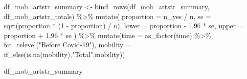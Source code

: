 \documentclass[
  letterpaper,
  DIV=11,
  numbers=noendperiod]{scrartcl}
\newenvironment{Shaded}{\begin{snugshade}}{\end{snugshade}}
\newcommand{\AttributeTok}[1]{\textcolor[rgb]{0.40,0.45,0.13}{#1}}
\newcommand{\DecValTok}[1]{\textcolor[rgb]{0.68,0.00,0.00}{#1}}
\newcommand{\FloatTok}[1]{\textcolor[rgb]{0.68,0.00,0.00}{#1}}
\newcommand{\FunctionTok}[1]{\textcolor[rgb]{0.28,0.35,0.67}{#1}}
\newcommand{\NormalTok}[1]{\textcolor[rgb]{0.00,0.23,0.31}{#1}}
\newcommand{\OtherTok}[1]{\textcolor[rgb]{0.00,0.23,0.31}{#1}}
\newcommand{\SpecialCharTok}[1]{\textcolor[rgb]{0.37,0.37,0.37}{#1}}
\newcommand{\StringTok}[1]{\textcolor[rgb]{0.13,0.47,0.30}{#1}}
\begin{document}
\begin{Shaded}
\begin{Highlighting}[]
\NormalTok{df\_mob\_artstr\_summary }\OtherTok{\textless{}{-}} \FunctionTok{bind\_rows}\NormalTok{(df\_mob\_artstr\_summary, df\_mob\_artstr\_totals) }\SpecialCharTok{\%\textgreater{}\%}
  \FunctionTok{mutate}\NormalTok{(}
    \AttributeTok{proportion =}\NormalTok{ n\_yes }\SpecialCharTok{/}\NormalTok{ n,}
    \AttributeTok{se =} \FunctionTok{sqrt}\NormalTok{(proportion }\SpecialCharTok{*}\NormalTok{ (}\DecValTok{1} \SpecialCharTok{{-}}\NormalTok{ proportion) }\SpecialCharTok{/}\NormalTok{ n),}
    \AttributeTok{lower =}\NormalTok{ proportion }\SpecialCharTok{{-}} \FloatTok{1.96} \SpecialCharTok{*}\NormalTok{ se,}
    \AttributeTok{upper =}\NormalTok{ proportion }\SpecialCharTok{+} \FloatTok{1.96} \SpecialCharTok{*}\NormalTok{ se}
\NormalTok{  ) }\SpecialCharTok{\%\textgreater{}\%} 
  \FunctionTok{mutate}\NormalTok{(}\AttributeTok{time =} \FunctionTok{as\_factor}\NormalTok{(time) }\SpecialCharTok{\%\textgreater{}\%} 
           \FunctionTok{fct\_relevel}\NormalTok{(}\StringTok{"Before Covid{-}19"}\NormalTok{),}
         \AttributeTok{mobility =} \FunctionTok{if\_else}\NormalTok{(}\FunctionTok{is.na}\NormalTok{(mobility),}\StringTok{"Total"}\NormalTok{,mobility))}

\NormalTok{df\_mob\_artstr\_summary}
\end{Highlighting}
\end{Shaded}
\end{document}
